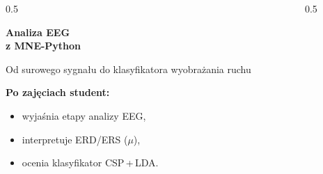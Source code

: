 \setsrc{}
\begin{frame}[plain]
\begin{columns}[T,onlytextwidth]
\begin{column}{0.5\textwidth}
\vspace{0.3cm}
{\color{plum}\bfseries\fontsize{25}{28}\selectfont Analiza EEG\\z MNE-Python\par}
\vspace{0.15cm}{\color{rose}\rule{3.2cm}{2pt}}\par\vspace{0.2cm}
{\fontsize{13}{16}\selectfont Od surowego sygnału do klasyfikatora wyobrażania ruchu\par}
\vspace{0.3cm}
{\color{plum}\bfseries Po zajęciach student:\par}\vspace{1pt}
\begin{itemize}\setlength\itemsep{1pt}
\item wyjaśnia etapy analizy EEG,
\item interpretuje ERD/ERS ($\mu$),
\item ocenia klasyfikator CSP\,+\,LDA.
\end{itemize}
\end{column}
\begin{column}{0.5\textwidth}
\raggedleft\vspace{0.2cm}
\end{column}
\end{columns}
\end{frame}
